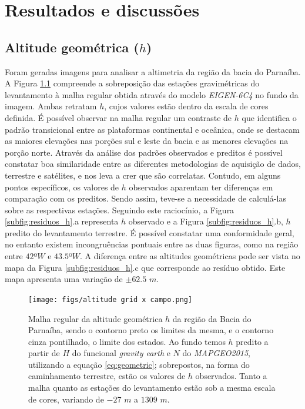 \chapter{Resultados e discussões}

\section{Altitude geométrica ($h$)}

Foram geradas imagens para analisar a altimetria da região da bacia do Parnaíba. A Figura \ref{fig:comparacao_h} compreende a sobreposição das estações gravimétricas do levantamento à malha regular obtida através do modelo \textit{EIGEN-6C4} no fundo da imagem. Ambas retratam $h$, cujos valores estão dentro da escala de cores definida. É possível observar na malha regular um contraste de $h$ que identifica o padrão transicional entre as plataformas continental e oceânica, onde se destacam as maiores elevações nas porções sul e leste da bacia e as menores elevações na porção norte. Através da análise dos padrões observados e preditos é possível constatar boa similaridade entre as diferentes metodologias de aquisição de dados, terrestre e satélites, e nos leva a crer que são correlatas. Contudo, em alguns pontos específicos, os valores de $h$ observados aparentam ter diferenças em comparação com os preditos. Sendo assim, teve-se a necessidade de calculá-las sobre as respectivas estações. Seguindo este raciocínio, a Figura \ref{subfig:residuos_h}.a representa $h$ observado e a Figura \ref{subfig:residuos_h}.b, $h$ predito do levantamento terrestre. É possível constatar uma conformidade geral, no entanto existem incongruências pontuais entre as duas figuras, como na região entre $42$º$W$ e $43.5$º$W$. A diferença entre as altitudes geométricas pode ser vista no mapa da Figura \ref{subfig:residuos_h}.c que corresponde ao resíduo obtido. Este mapa apresenta uma variação de $\pm 62.5$ $m$.

\begin{figure}[H]
	\centering
	\texttt{[image: figs/altitude grid x campo.png]}	
	\caption{Malha regular da altitude geométrica $h$ da região da Bacia do Parnaíba, sendo o contorno preto os limites da mesma, e o contorno cinza pontilhado, o limite dos estados. Ao fundo temos $h$ predito a partir de $H$ do funcional \textit{gravity earth} e $N$ do \textit{MAPGEO2015}, utilizando a equação \ref{eq:geometric}; sobrepostos, na forma do caminhamento terrestre, estão os valores de $h$ observados. Tanto a malha quanto as estações do levantamento estão sob a mesma escala de cores, variando de $-27$ $m$ a $1309$ $m$.}%
	\label{fig:comparacao_h}
\end{figure}

